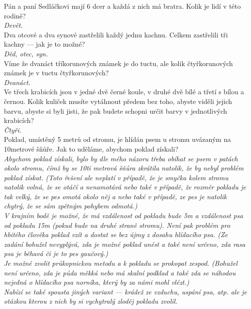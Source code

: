 \begin{multicols}{2}
\noindent
Pán a paní Sedláčkovi mají 6 dcer a každá z nich má bratra. 
Kolik je lidí v této rodině?\\[1 mm]
{\sl Devět.}\\

\noindent
Dva otcové a dva synové zastřelili každý jednu kachnu. Celkem 
zastřelili tři kachny --- jak je to možné?\\[1 mm]
{\sl Děd, otec, syn.}\\

\noindent
Víme že dvanáct tříkorunových známek je do tuctu, ale kolik 
čtyřkorunových známek je v tuctu čtyřkorunových?\\[1 mm]
{\sl Dvanáct.}\\

\noindent
Ve třech krabicích jsou v jedné dvě černé koule, v druhé 
dvě bílé a třetí s bílou a černou. Kolik kuliček musíte vytáhnout 
předem bez toho, abyste viděli jejich barvu, abyste si byli jisti, 
že pak budete schopni určit barvy v jednotlivých krabicích?\\[1 mm]
{\sl Čtyři.}\\

\noindent
Poklad, umístěný 5 metrů od stromu, je hlídán psem u stromu 
uvázaným na 10metrové šňůře. Jak to uděláme, abychom poklad
získali?\\[1 mm]
{\sl Abychom poklad získali, bylo by dle mého názoru třeba obíhat 
se psem v patách okolo stromu, čímž by se 10ti metrová šňůra zkrátila 
natolik, že by nebyl problém poklad získat. (Toto řešení ale 
neplatí v případě, že je smyčka kolem stromu natolik volná, že 
se otáčí a nenamotává nebo také v případě, že rozměr pokladu 
je tak velký, že se pes omotá okolo něj a nebo také v případě, 
ze pes je natolik chytrý, že se sám zpětným pohybem odmotá.)\\[1 mm]
V krajním bodě je možné, že má vzdálenost od pokladu bude 
5m a vzdálenost psa od pokladu 15m (pokud bude na druhé straně 
stromu). Není pak problém pro hbitého člověka poklad vzít a dostat 
se bez újmy z dosahu hlídacího psa. (Ze zadání bohužel nevyplývá, 
zda je možné poklad unést a také není určeno, zda rasa psa je 
běhavá či je to pes gaučový.)\\[1 mm]
Je možné zvolit průkopnickou metodu a k pokladu se prokopat 
zespod. (Bohužel není určeno, zda je půda měkká nebo má skalní 
podklad a také zda se náhodou nejedná o hlídacího psa norníka, 
který by za námi mohl vlézt.)\\[1 mm]
Nabízí se také spousta jiných variant --- krádež ze vzduchu, 
uspání psa, atp. ale je otázkou kterou z nich by si vychytralý
zloděj pokladu zvolil.}\\


\end{multicols}
